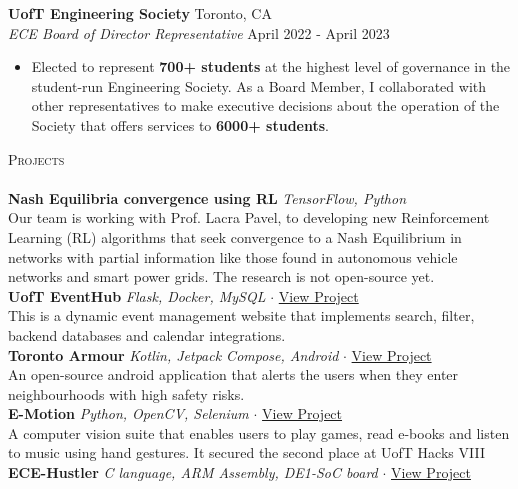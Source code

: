 \documentclass[a4paper]{article}
\newcommand{\lineunder} {
    \vspace*{-8pt} \\
    \hspace*{-18pt} \hrulefill \\
}
\newcommand{\header} [1] {
    {\hspace*{-18pt}\vspace*{6pt} \textsc{#1}}
    \vspace*{-6pt} \lineunder
}
\begin{document}
\textbf{UofT Engineering Society} \hfill Toronto, CA\\
\textit{ECE Board of Director Representative} \hfill April 2022 - April 2023\\
\vspace{-3pt}
\begin{itemize}
	\item Elected to represent \textbf{700+ students} at the highest level of governance in the student-run Engineering Society. As a Board Member, I collaborated with other representatives to make executive decisions about the operation of the Society that offers services to \textbf{6000+ students}.
\end{itemize}

\header{Projects}
{\textbf{Nash Equilibria convergence using RL}} {\sl TensorFlow, Python} \\
Our team is working with Prof. Lacra Pavel, to developing new Reinforcement Learning (RL) algorithms that seek convergence to a Nash Equilibrium in networks
 with partial information like those found in autonomous vehicle networks and smart power grids. The research is not open-source yet.\\
\vspace*{2mm}
{\textbf{UofT EventHub}} {\sl Flask, Docker, MySQL} $\cdot$ \href{https://netninjahub.onrender.com/}{View Project}\\
This is a dynamic event management website that implements search, filter, backend databases and calendar integrations. \\
\vspace*{2mm}
{\textbf{Toronto Armour}} {\sl Kotlin, Jetpack Compose, Android} $\cdot$ \href{https://tinyurl.com/4jxuna82}{View Project} \\
An open-source android application that alerts the users when they enter neighbourhoods with high safety risks.\\
\vspace*{2mm}
{\textbf{E-Motion}} {\sl Python, OpenCV, Selenium} $\cdot$ \href{https://tinyurl.com/cyhtt8jr}{View Project} \\
A computer vision suite that enables users to play games, read e-books and listen to music using hand gestures. It secured the second place at UofT Hacks VIII\\
\vspace*{2mm}
{\textbf{ECE-Hustler}} {\sl C language, ARM Assembly, DE1-SoC board} $\cdot$ \href{https://tinyurl.com/d38wrur3}{View Project} \\
\end{document}
